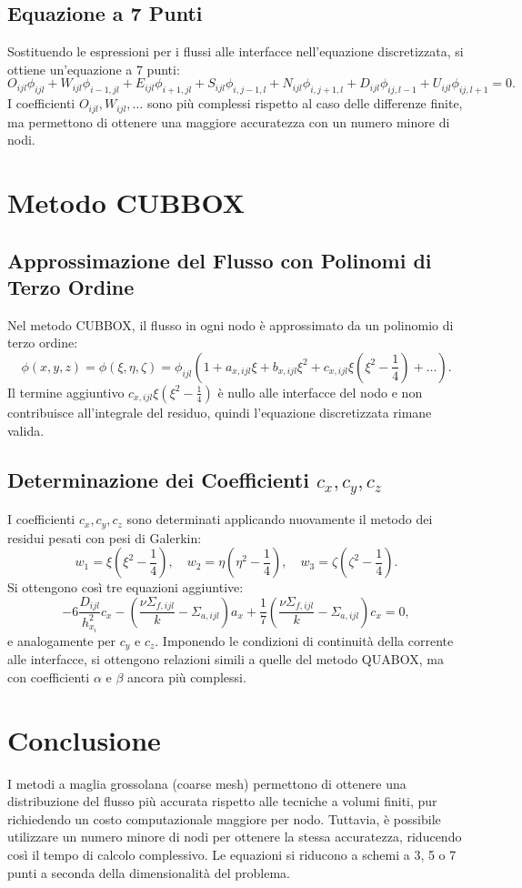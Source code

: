 \subsection{Equazione a 7 Punti}
Sostituendo le espressioni per i flussi alle interfacce nell'equazione discretizzata, si ottiene un'equazione a 7 punti:
\[
O_{ijl} \phi_{ijl} + W_{ijl} \phi_{i-1,jl} + E_{ijl} \phi_{i+1,jl} + S_{ijl} \phi_{i,j-1,l} + N_{ijl} \phi_{i,j+1,l} + D_{ijl} \phi_{ij,l-1} + U_{ijl} \phi_{ij,l+1} = 0.
\]
I coefficienti \(O_{ijl}, W_{ijl}, \dots\) sono più complessi rispetto al caso delle differenze finite, ma permettono di ottenere una maggiore accuratezza con un numero minore di nodi.

\section{Metodo CUBBOX}

\subsection{Approssimazione del Flusso con Polinomi di Terzo Ordine}
Nel metodo CUBBOX, il flusso in ogni nodo è approssimato da un polinomio di terzo ordine:
\[
\phi(x, y, z) = \phi(\xi, \eta, \zeta) = \phi_{ijl} \left(1 + a_{x,ijl} \xi + b_{x,ijl} \xi^2 + c_{x,ijl} \xi \left(\xi^2 - \frac{1}{4}\right) + \dots \right).
\]
Il termine aggiuntivo \(c_{x,ijl} \xi \left(\xi^2 - \frac{1}{4}\right)\) è nullo alle interfacce del nodo e non contribuisce all'integrale del residuo, quindi l'equazione discretizzata rimane valida.

\subsection{Determinazione dei Coefficienti \(c_x, c_y, c_z\)}
I coefficienti \(c_x, c_y, c_z\) sono determinati applicando nuovamente il metodo dei residui pesati con pesi di Galerkin:
\[
w_1 = \xi \left(\xi^2 - \frac{1}{4}\right), \quad w_2 = \eta \left(\eta^2 - \frac{1}{4}\right), \quad w_3 = \zeta \left(\zeta^2 - \frac{1}{4}\right).
\]
Si ottengono così tre equazioni aggiuntive:
\[
-6 \frac{D_{ijl}}{h_{x_i}^2} c_x - \left( \frac{\nu \Sigma_{f,ijl}}{k} - \Sigma_{a,ijl} \right) a_x + \frac{1}{7} \left( \frac{\nu \Sigma_{f,ijl}}{k} - \Sigma_{a,ijl} \right) c_x = 0,
\]
e analogamente per \(c_y\) e \(c_z\). Imponendo le condizioni di continuità della corrente alle interfacce, si ottengono relazioni simili a quelle del metodo QUABOX, ma con coefficienti \(\alpha\) e \(\beta\) ancora più complessi.

\section{Conclusione}
I metodi a maglia grossolana (coarse mesh) permettono di ottenere una distribuzione del flusso più accurata rispetto alle tecniche a volumi finiti, pur richiedendo un costo computazionale maggiore per nodo. Tuttavia, è possibile utilizzare un numero minore di nodi per ottenere la stessa accuratezza, riducendo così il tempo di calcolo complessivo. Le equazioni si riducono a schemi a 3, 5 o 7 punti a seconda della dimensionalità del problema.